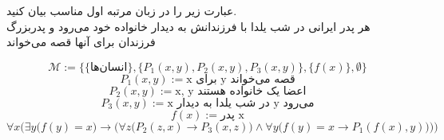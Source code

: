 	عبارت زیر را در زبان مرتبه اول مناسب بیان کنید.\\
هر پدر ایرانی در شب یلدا با فرزندانش به دیدار خانواده خود می‌رود و پدربزرگ فرزندان برای آنها قصه می‌خواند
\quad\vspace{0.5 cm}	
\begin{ans}
	$$
		\mathcal{M} := \{\{\text{انسان‌ها}\}, \{P_1(x, y), P_2(x, y), P_3(x, y)\}, \{f(x)\}, \emptyset\}
	$$
	$$
		{P_1}(x, y) := \text{x برای y قصه می‌خواند}
	$$
	$$ 
		{P_2}(x, y) := \text{x, y اعضا یک خانواده هستند}
	$$
	$$
		{P_3}(x, y) := \text{x در شب یلدا به دیدار y می‌رود}
	$$
	$$
		f(x) := \text{پدر x}
	$$
	$$
		\forall x \Bigg(\exists y \Big(f(y) = x\Big) \rightarrow \bigg({\forall z \Big({P_2}(z, x) \rightarrow {P_3}(x, z)\Big) \wedge \forall y \Big(f(y) = x \rightarrow {P_1}(f(x), y)\Big)\bigg)}\Bigg)
	$$
\end{ans}
